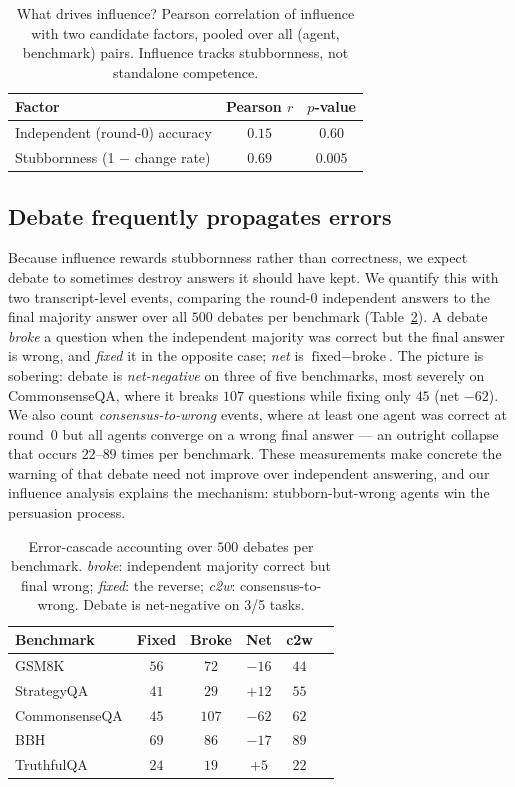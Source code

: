 \begin{table}[t]
\centering
\small
\caption{What drives influence? Pearson correlation of influence with two candidate
factors, pooled over all (agent, benchmark) pairs. Influence tracks stubbornness,
not standalone competence.}
\label{tab:source}
\begin{tabular}{lcc}
\toprule
Factor & Pearson $r$ & $p$-value \\
\midrule
Independent (round-0) accuracy & $0.15$ & $0.60$ \\
Stubbornness (1 $-$ change rate) & $\mathbf{0.69}$ & $\mathbf{0.005}$ \\
\bottomrule
\end{tabular}
\end{table}

\subsection{Debate frequently propagates errors}
\label{sec:rq4}

Because influence rewards stubbornness rather than correctness, we expect debate to
sometimes destroy answers it should have kept. We quantify this with two
transcript-level events, comparing the round-0 independent answers to the final
majority answer over all $500$ debates per benchmark (Table~\ref{tab:cascade}). A
debate \emph{broke} a question when the independent majority was correct but the
final answer is wrong, and \emph{fixed} it in the opposite case; \emph{net} is
$\text{fixed}-\text{broke}$. The picture is sobering: debate is
\emph{net-negative} on three of five benchmarks, most severely on CommonsenseQA,
where it breaks $107$ questions while fixing only $45$ (net $-62$). We also count
\emph{consensus-to-wrong} events, where at least one agent was correct at round~0
but all agents converge on a wrong final answer --- an outright collapse that occurs
$22$--$89$ times per benchmark. These measurements make concrete the warning of
\cite{b12} that debate need not improve over independent answering, and our
influence analysis explains the mechanism: stubborn-but-wrong agents win the
persuasion process.

\begin{table}[t]
\centering
\small
\caption{Error-cascade accounting over $500$ debates per benchmark. \emph{broke}:
independent majority correct but final wrong; \emph{fixed}: the reverse; \emph{c2w}:
consensus-to-wrong. Debate is net-negative on 3/5 tasks.}
\label{tab:cascade}
\begin{tabular}{lccccc}
\toprule
Benchmark & Fixed & Broke & Net & c2w \\
\midrule
GSM8K         & $56$ & $72$  & $-16$ & $44$ \\
StrategyQA    & $41$ & $29$  & $+12$ & $55$ \\
CommonsenseQA & $45$ & $107$ & $-62$ & $62$ \\
BBH           & $69$ & $86$  & $-17$ & $89$ \\
TruthfulQA    & $24$ & $19$  & $+5$  & $22$ \\
\bottomrule
\end{tabular}
\end{table}

